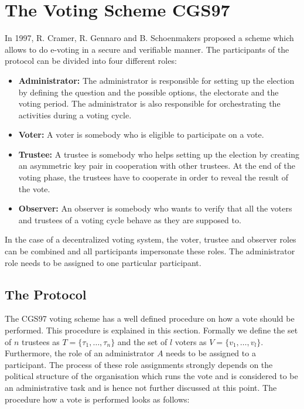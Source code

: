 \documentclass[numbers=noenddot, abstract=on, a4paper, headsepline,
footsepline, oneside, openright, draft=off, listof=leveldown]{scrreprt}
\begin{document}
\section{The Voting Scheme CGS97}
\label{sec:CGS97}
In 1997, R. Cramer, R. Gennaro and B. Schoenmakers proposed a scheme
\cite{CGS97} which allows to do e-voting in a secure and verifiable manner. The participants of
the protocol can be divided into four different roles:
\begin{itemize}
  \item \textbf{Administrator:} The administrator is responsible for setting up
  the election by defining the question and the possible options, the
  electorate and the voting period. The administrator is also responsible for
  orchestrating the activities during a voting cycle.
  \item \textbf{Voter:} A voter is somebody who is eligible to participate on
  a vote. 
  \item \textbf{Trustee:} A trustee is somebody who helps setting up the
  election by creating an asymmetric key pair in cooperation with other
  trustees.
  At the end of the voting phase, the trustees have to cooperate in order to
  reveal the result of the vote.
  \item \textbf{Observer:} An observer is somebody who wants to verify that all
  the voters and trustees of a voting cycle behave as they are supposed to.
\end{itemize}

In the case of a decentralized voting system, the voter, trustee and
observer roles can be combined and all participants impersonate these roles. The
administrator role needs to be assigned to one particular participant.

\subsection{The Protocol}
The CGS97 voting scheme has a well defined procedure on how a vote should be
performed. This procedure is explained in this section. Formally we define the set
of $n$ trustees as $T=\{\tau_1, \ldots, \tau_n\}$ and the set of $l$
voters as $V=\{v_1, \ldots, v_l\}$. Furthermore, the role of an
administrator $A$ needs to be assigned to a participant. The process of these role assignments
strongly depends on the political structure of the organisation which runs
the vote and is considered to be an administrative task and is hence not
further discussed at this point. The procedure how a vote is performed looks as
follows:
\end{document}
